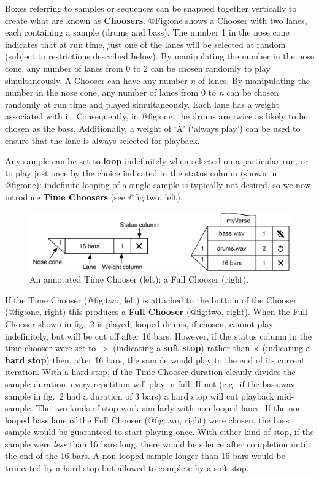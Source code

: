\documentclass[]{article}
\begin{document}
Boxes referring to samples or sequences can be snapped together
vertically to create what are known as \textbf{Choosers}. @Fig:one shows
a Chooser with two lanes, each containing a sample (drums and bass). The
number 1 in the nose cone indicates that at run time, just one of the
lanes will be selected at random (subject to restrictions described
below). By manipulating the number in the nose cone, any number of lanes
from 0 to 2 can be chosen randomly to play simultaneously. A Chooser can
have any number \emph{n} of lanes. By manipulating the number in the
nose cone, any number of lanes from 0 to \emph{n} can be chosen randomly
at run time and played simultaneously. Each lane has a weight associated
with it. Consequently, in @fig:one, the drums are twice as likely to be
chosen as the bass. Additionally, a weight of `A' (`always play') can be
used to ensure that the lane is always selected for playback.

Any sample can be set to \textbf{loop} indefinitely when selected on a
particular run, or to play just once by the choice indicated in the
status column (shown in @fig:one): indefinite looping of a single sample
is typically not desired, so we now introduce \textbf{Time Choosers}
(see @fig:two, left).

\begin{figure}
\hypertarget{fig:two}{%
\centering
\includegraphics{./media/image2.png}
\caption{An annotated Time Chooser (left); a Full Chooser
(right).}\label{fig:two}
}
\end{figure}

If the Time Chooser (@fig:two, left) is attached to the bottom of the
Chooser (@fig:one, right) this produces a \textbf{Full Chooser}
(@fig:two, right). When the Full Chooser shown in fig.~2 is played,
looped drums, if chosen, cannot play indefinitely, but will be cut off
after 16 bars. However, if the status column in the time chooser were
set to \(>\) (indicating a \textbf{soft stop}) rather than \(\times\)
(indicating a \textbf{hard stop}) then, after 16 bars, the sample would
play to the end of its current iteration. With a hard stop, if the Time
Chooser duration cleanly divides the sample duration, every repetition
will play in full. If not (e.g.~if the bass.wav sample in fig.~2 had a
duration of 3 bars) a hard stop will cut playback mid-sample. The two
kinds of stop work similarly with non-looped lanes. If the non-looped
bass lane of the Full Chooser (@fig:two, right) were chosen, the bass
sample would be guaranteed to start playing once. With either kind of
stop, if the sample were \emph{less} than 16 bars long, there would be
silence after completion until the end of the 16 bars. A non-looped
sample longer than 16 bars would be truncated by a hard stop but allowed
to complete by a soft stop.
\end{document}
